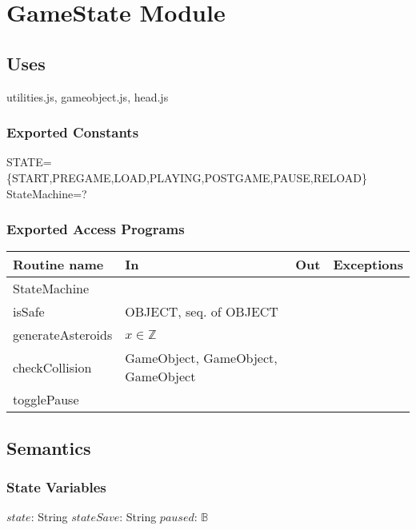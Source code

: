 \documentclass[12pt]{article}
\begin{document}
\newpage

\section*{GameState Module}

\subsection*{Uses}

utilities.js, gameobject.js, head.js\\

\subsubsection*{Exported Constants}

STATE=\{START,PREGAME,LOAD,PLAYING,POSTGAME,PAUSE,RELOAD\}\\
StateMachine=?\\

\subsubsection*{Exported Access Programs}

\begin{tabular}{| l | l | l | l |}
    \hline
    \textbf{Routine name} & \textbf{In} & \textbf{Out} & \textbf{Exceptions}\\
    \hline
    StateMachine &  & ~ & ~\\
    \hline
    isSafe & OBJECT, seq. of OBJECT & ~ & ~\\
    \hline
    generateAsteroids & $x \in \mathbb{Z}$ & ~ & ~ \\
    \hline
    checkCollision & GameObject, GameObject, GameObject & ~ & ~ \\
    \hline
    togglePause & ~ & ~ & ~ \\
    \hline
\end{tabular}

\subsection* {Semantics}

\subsubsection* {State Variables}

$state$: String
$stateSave$: String
$paused$: $\mathbb{B}$
\end{document}
